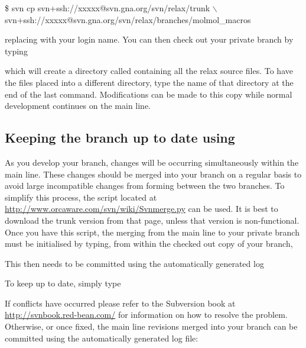 \begin{exampleenv}
\$ svn cp svn+ssh://xxxxx@svn.gna.org/svn/relax/trunk $\backslash$ \\
 svn+ssh://xxxxx@svn.gna.org/svn/relax/branches/molmol\_macros
\end{exampleenv}

replacing  with your login name.
You can then check out your private branch by typing


which will create a directory called  containing all the relax source files.
To have the files placed into a different directory, type the name of that directory at the end of the last command.
Modifications can be made to this copy while normal development continues on the main line.


\subsection{Keeping the branch up to date using }

As you develop your branch, changes will be occurring simultaneously within the main line.
These changes should be merged into your branch on a regular basis to avoid large incompatible changes from forming between the two branches.
To simplify this process, the  script located at \href{http://www.orcaware.com/svn/wiki/Svnmerge.py}{http://www.orcaware.com/svn/wiki/Svnmerge.py} can be used.
It is best to download the trunk version from that page, unless that version is non-functional.
Once you have this script, the merging from the main line to your private branch must be initialised by typing, from within the checked out copy of your branch,


This then needs to be committed using the automatically generated log


To keep up to date, simply type



If conflicts have occurred please refer to the Subversion book at \href{http://svnbook.red-bean.com/}{http://svnbook.red-bean.com/} for information on how to resolve the problem.
Otherwise, or once fixed, the main line revisions merged into your branch can be committed using the automatically generated log file:

